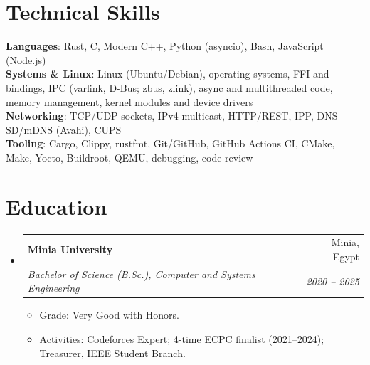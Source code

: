 \documentclass[letterpaper,11pt]{article}
\makeatletter
\newcommand{\resumeItem}[1]{
  \item\small{
    {#1 \vspace{-2pt}}
  }
}
\newcommand{\resumeSubheading}[4]{
  \vspace{-2pt}\item
    \begin{tabular*}{0.97\textwidth}[t]{l@{\extracolsep{\fill}}r}
      \textbf{#1} & #2 \\
      \textit{\small#3} & \textit{\small #4} \\
    \end{tabular*}\vspace{-7pt}
}
\newcommand{\resumeSubHeadingListStart}{\begin{itemize}[leftmargin=0.15in, label={}]}
\newcommand{\resumeSubHeadingListEnd}{\end{itemize}}
\newcommand{\resumeItemListStart}{\begin{itemize}}
\newcommand{\resumeItemListEnd}{\end{itemize}\vspace{-5pt}}
\makeatother
\begin{document}
%
\section{Technical Skills}
 \begin{itemize}[leftmargin=0.15in, label={}]
    \small{\item{
     \textbf{Languages}{: Rust, C, Modern C++, Python (asyncio), Bash, JavaScript (Node.js)} \\
     \textbf{Systems \& Linux}{: Linux (Ubuntu/Debian), operating systems, FFI and bindings, IPC (varlink, D-Bus; zbus, zlink), async and multithreaded code, memory management, kernel modules and device drivers} \\
     \textbf{Networking}{: TCP/UDP sockets, IPv4 multicast, HTTP/REST, IPP, DNS-SD/mDNS (Avahi), CUPS} \\
     \textbf{Tooling}{: Cargo, Clippy, rustfmt, Git/GitHub, GitHub Actions CI, CMake, Make, Yocto, Buildroot, QEMU, debugging, code review}
    }}
 \end{itemize}

\section{Education}
  \resumeSubHeadingListStart
    \resumeSubheading
      {Minia University}{Minia, Egypt}
      {Bachelor of Science (B.Sc.), Computer and Systems Engineering}{2020 -- 2025}
      \resumeItemListStart
        \resumeItem{Grade: Very Good with Honors.}
        \resumeItem{Activities: Codeforces Expert; 4-time ECPC finalist (2021--2024); Treasurer, IEEE Student Branch.}
      \resumeItemListEnd
  \resumeSubHeadingListEnd


\end{document}
